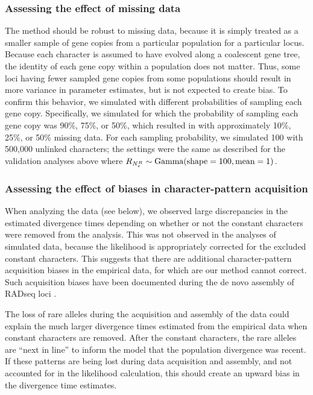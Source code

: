 \subsubsection{Assessing the effect of missing data}
The method should be robust to missing data, because it is simply treated as a
smaller sample of gene copies from a particular population for a particular
locus.
Because each character is assumed to have evolved along a coalescent
gene tree, the identity of each gene copy within a population does not matter.
Thus, some loci having fewer sampled gene copies from some populations should
result in more variance in parameter estimates, but is not expected to create
bias.
To confirm this behavior, we simulated \datasets with different probabilities of
sampling each gene copy.
Specifically, we simulated \datasets for which the probability of sampling each
gene copy was 90\%, 75\%, or 50\%, which resulted in \datasets with
approximately 10\%, 25\%, or 50\% missing data.
For each sampling probability, we simulated 100 \datasets with 500,000 unlinked
characters; the settings were the same as described for the validation analyses
above where $R_{N_{e}^{R{}}} \sim \textrm{Gamma}(\textrm{shape} = 100, \textrm{mean} = 1)$.

\subsubsection{Assessing the effect of biases in character-pattern acquisition}
When analyzing the  data (see below), we observed large
discrepancies in the estimated divergence times depending on whether or not the
constant characters were removed from the analysis.
This was not observed in the analyses of simulated data, because the likelihood
is appropriately corrected for the excluded constant characters.
This suggests that there are additional character-pattern acquisition biases in
the empirical data, for which are our method cannot correct.
Such acquisition biases have been documented during the de novo assembly of
RADseq loci \citep{Harvey2015,Linck2017}.

The loss of rare alleles during the acquisition and assembly of the data could
explain the much larger divergence times estimated from the empirical data when
constant characters are removed.
After the constant characters, the rare alleles are ``next in line'' to inform
the model that the population divergence was recent.
If these patterns are being lost during data acquisition and assembly, and not
accounted for in the likelihood calculation, this should create an upward bias
in the divergence time estimates.

